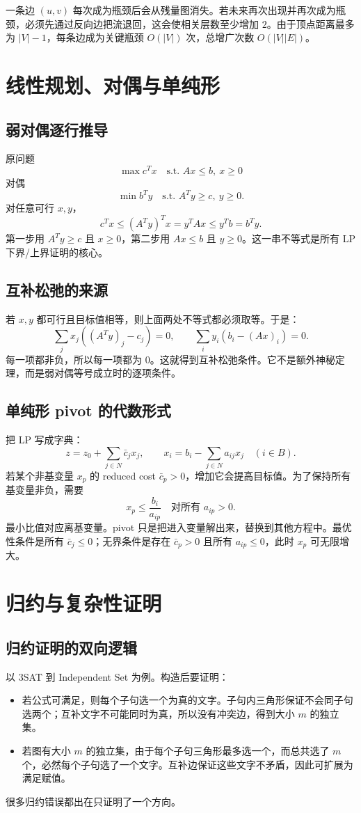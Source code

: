 \documentclass[UTF8,openany,12pt]{ctexbook}
\theoremstyle{remark}
\begin{document}
一条边 $(u,v)$ 每次成为瓶颈后会从残量图消失。若未来再次出现并再次成为瓶颈，必须先通过反向边把流退回，这会使相关层数至少增加 $2$。由于顶点距离最多为 $|V|-1$，每条边成为关键瓶颈 $O(|V|)$ 次，总增广次数 $O(|V||E|)$。

\section{线性规划、对偶与单纯形}
\subsection{弱对偶逐行推导}
原问题
\[
\max c^Tx\quad \text{s.t. } Ax\le b,\ x\ge 0
\]
对偶
\[
\min b^Ty\quad \text{s.t. } A^Ty\ge c,\ y\ge 0.
\]
对任意可行 $x,y$，
\[
c^Tx\le (A^Ty)^Tx=y^TAx\le y^Tb=b^Ty.
\]
第一步用 $A^Ty\ge c$ 且 $x\ge0$，第二步用 $Ax\le b$ 且 $y\ge0$。这一串不等式是所有 LP 下界/上界证明的核心。

\subsection{互补松弛的来源}
若 $x,y$ 都可行且目标值相等，则上面两处不等式都必须取等。于是：
\[
\sum_j x_j((A^Ty)_j-c_j)=0,
\qquad
\sum_i y_i(b_i-(Ax)_i)=0.
\]
每一项都非负，所以每一项都为 $0$。这就得到互补松弛条件。它不是额外神秘定理，而是弱对偶等号成立时的逐项条件。

\subsection{单纯形 pivot 的代数形式}
把 LP 写成字典：
\[
z=z_0+\sum_{j\in N}\bar c_j x_j,\qquad
x_i=b_i-\sum_{j\in N}a_{ij}x_j\quad (i\in B).
\]
若某个非基变量 $x_p$ 的 reduced cost $\bar c_p>0$，增加它会提高目标值。为了保持所有基变量非负，需要
\[
x_p\le \frac{b_i}{a_{ip}}\quad\text{对所有 }a_{ip}>0.
\]
最小比值对应离基变量。pivot 只是把进入变量解出来，替换到其他方程中。最优性条件是所有 $\bar c_j\le0$；无界条件是存在 $\bar c_p>0$ 且所有 $a_{ip}\le0$，此时 $x_p$ 可无限增大。

\section{归约与复杂性证明}
\subsection{归约证明的双向逻辑}
以 3SAT 到 Independent Set 为例。构造后要证明：
\begin{itemize}
  \item 若公式可满足，则每个子句选一个为真的文字。子句内三角形保证不会同子句选两个；互补文字不可能同时为真，所以没有冲突边，得到大小 $m$ 的独立集。
  \item 若图有大小 $m$ 的独立集，由于每个子句三角形最多选一个，而总共选了 $m$ 个，必然每个子句选了一个文字。互补边保证这些文字不矛盾，因此可扩展为满足赋值。
\end{itemize}
很多归约错误都出在只证明了一个方向。
\end{document}
